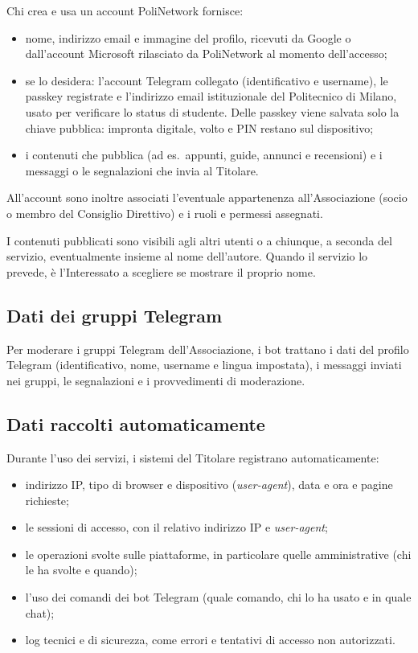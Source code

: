 \documentclass[legal]{polinetwork}
\begin{document}
Chi crea e usa un account PoliNetwork fornisce:
\begin{itemize}
    \item nome, indirizzo email e immagine del profilo, ricevuti da Google o dall'account Microsoft rilasciato da PoliNetwork al momento dell'accesso;
    \item se lo desidera: l'account Telegram collegato (identificativo e username), le passkey registrate e l'indirizzo email istituzionale del Politecnico di Milano, usato per verificare lo status di studente. Delle passkey viene salvata solo la chiave pubblica: impronta digitale, volto e PIN restano sul dispositivo;
    \item i contenuti che pubblica (ad es.~appunti, guide, annunci e recensioni) e i messaggi o le segnalazioni che invia al Titolare.
\end{itemize}

All'account sono inoltre associati l'eventuale appartenenza all'Associazione (socio o membro del Consiglio Direttivo) e i ruoli e permessi assegnati.

I contenuti pubblicati sono visibili agli altri utenti o a chiunque, a seconda del servizio, eventualmente insieme al nome dell'autore. Quando il servizio lo prevede, è l'Interessato a scegliere se mostrare il proprio nome.

\subsection{Dati dei gruppi Telegram}
\label{sec:dati-telegram}

Per moderare i gruppi Telegram dell'Associazione, i bot trattano i dati del profilo Telegram (identificativo, nome, username e lingua impostata), i messaggi inviati nei gruppi, le segnalazioni e i provvedimenti di moderazione.

\subsection{Dati raccolti automaticamente}
\label{sec:dati-automatici}

Durante l'uso dei servizi, i sistemi del Titolare registrano automaticamente:
\begin{itemize}
    \item indirizzo IP, tipo di browser e dispositivo (\textit{user-agent}), data e ora e pagine richieste;
    \item le sessioni di accesso, con il relativo indirizzo IP e \textit{user-agent};
    \item le operazioni svolte sulle piattaforme, in particolare quelle amministrative (chi le ha svolte e quando);
    \item l'uso dei comandi dei bot Telegram (quale comando, chi lo ha usato e in quale chat);
    \item log tecnici e di sicurezza, come errori e tentativi di accesso non autorizzati.
\end{itemize}
\end{document}
